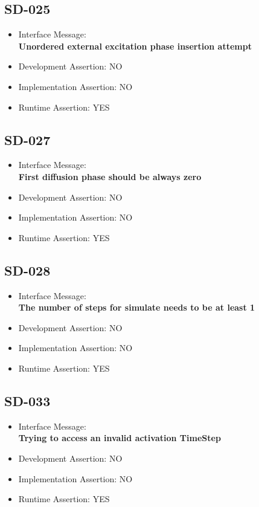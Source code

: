 \subsection{SD-025}
\begin{itemize}
  \item Interface Message:\\[1em]
    \textbf{Unordered external excitation phase insertion attempt}
  \item Development Assertion: NO
  \item Implementation Assertion: NO
  \item Runtime Assertion: YES
\end{itemize}

\subsection{SD-027}
\begin{itemize}
  \item Interface Message:\\[1em]
    \textbf{First diffusion phase should be always zero}
  \item Development Assertion: NO
  \item Implementation Assertion: NO
  \item Runtime Assertion: YES
\end{itemize}

\subsection{SD-028}
\begin{itemize}
  \item Interface Message:\\[1em]
    \textbf{The number of steps for simulate needs to be at least 1}
  \item Development Assertion: NO
  \item Implementation Assertion: NO
  \item Runtime Assertion: YES
\end{itemize}

\subsection{SD-033}
\begin{itemize}
  \item Interface Message:\\[1em]
    \textbf{Trying to access an invalid activation TimeStep}
  \item Development Assertion: NO
  \item Implementation Assertion: NO
  \item Runtime Assertion: YES
\end{itemize}

